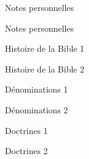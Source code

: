 \documentclass[11pt]{book}
\begin{document}
\clearpage
\clearpage
\clearpage
\clearpage\makeatletter\def\@evenhead{}\def\@oddhead{}\makeatother\begin{center}Notes personnelles\end{center}\clearpage\makeatletter\def\@evenhead{{\NoAutoSpaceBeforeFDP{\small{\rightmark\hfil\thepage\hfil\leftmark}}}}\def\@oddhead{{\NoAutoSpaceBeforeFDP{\small{\rightmark\hfil\thepage\hfil\leftmark}}}}\makeatother
\clearpage
\clearpage\makeatletter\def\@evenhead{}\def\@oddhead{}\makeatother\begin{center}Notes personnelles\end{center}\clearpage\makeatletter\def\@evenhead{{\NoAutoSpaceBeforeFDP{\small{\rightmark\hfil\thepage\hfil\leftmark}}}}\def\@oddhead{{\NoAutoSpaceBeforeFDP{\small{\rightmark\hfil\thepage\hfil\leftmark}}}}\makeatother
\clearpage
{}\clearpage
\makeatletter
    \def\@oddhead{{\small{\hfil\thepage\hfil}}}
    \def\@evenhead{{\small{\hfil\thepage\hfil}}}\clearpage
    \makeatother
        \small{\par\clearpage}\markboth{}{}
    \makeatletter
    \def\@oddhead{\hfil\thepage\hfil}
    \def\@evenhead{\hfil}
\makeatother
\clearpage
\begin{center}Histoire de la Bible 1\end{center}\clearpage
\begin{center}Histoire de la Bible 2\end{center}\clearpage
{}\clearpage
\begin{center}Dénominations 1\end{center}\clearpage
\begin{center}Dénominations 2\end{center}\clearpage
{}\clearpage
\begin{center}Doctrines 1\end{center}\clearpage
\begin{center}Doctrines 2\end{center}\clearpage
\end{document}
